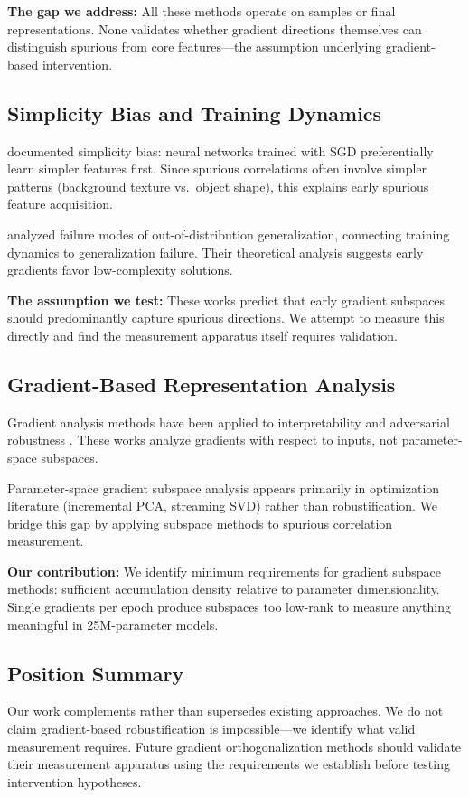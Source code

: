 \textbf{The gap we address:} All these methods operate on samples or final representations. None validates whether gradient directions themselves can distinguish spurious from core features---the assumption underlying gradient-based intervention.

\subsection{Simplicity Bias and Training Dynamics}

\citet{shah2020pitfalls} documented simplicity bias: neural networks trained with SGD preferentially learn simpler features first. Since spurious correlations often involve simpler patterns (background texture vs.\ object shape), this explains early spurious feature acquisition.

\citet{nagarajan2021understanding} analyzed failure modes of out-of-distribution generalization, connecting training dynamics to generalization failure. Their theoretical analysis suggests early gradients favor low-complexity solutions.

\textbf{The assumption we test:} These works predict that early gradient subspaces should predominantly capture spurious directions. We attempt to measure this directly and find the measurement apparatus itself requires validation.

\subsection{Gradient-Based Representation Analysis}

Gradient analysis methods have been applied to interpretability \citep{simonyan2014deep, sundararajan2017axiomatic} and adversarial robustness \citep{madry2018towards}. These works analyze gradients with respect to inputs, not parameter-space subspaces.

Parameter-space gradient subspace analysis appears primarily in optimization literature (incremental PCA, streaming SVD) rather than robustification. We bridge this gap by applying subspace methods to spurious correlation measurement.

\textbf{Our contribution:} We identify minimum requirements for gradient subspace methods: sufficient accumulation density relative to parameter dimensionality. Single gradients per epoch produce subspaces too low-rank to measure anything meaningful in 25M-parameter models.

\subsection{Position Summary}

Our work complements rather than supersedes existing approaches. We do not claim gradient-based robustification is impossible---we identify what valid measurement requires. Future gradient orthogonalization methods should validate their measurement apparatus using the requirements we establish before testing intervention hypotheses.
